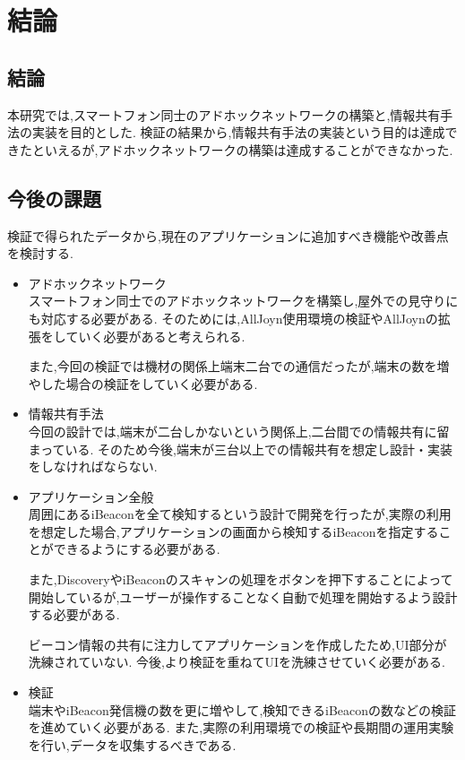 \chapter{結論}
\section{結論}
本研究では,スマートフォン同士のアドホックネットワークの構築と,情報共有手法の実装を目的とした.
検証の結果から,情報共有手法の実装という目的は達成できたといえるが,アドホックネットワークの構築は達成することができなかった.

\section{今後の課題}
検証で得られたデータから,現在のアプリケーションに追加すべき機能や改善点を検討する.

\begin{itemize}
\item アドホックネットワーク \\
スマートフォン同士でのアドホックネットワークを構築し,屋外での見守りにも対応する必要がある.
そのためには,AllJoyn使用環境の検証やAllJoynの拡張をしていく必要があると考えられる.

また,今回の検証では機材の関係上端末二台での通信だったが,端末の数を増やした場合の検証をしていく必要がある.

\item 情報共有手法 \\
今回の設計では,端末が二台しかないという関係上,二台間での情報共有に留まっている.
そのため今後,端末が三台以上での情報共有を想定し設計・実装をしなければならない.

\item アプリケーション全般 \\
  周囲にあるiBeaconを全て検知するという設計で開発を行ったが,実際の利用を想定した場合,アプリケーションの画面から検知するiBeaconを指定することができるようにする必要がある.
  
  また,DiscoveryやiBeaconのスキャンの処理をボタンを押下することによって開始しているが,ユーザーが操作することなく自動で処理を開始するよう設計する必要がある.
  
  ビーコン情報の共有に注力してアプリケーションを作成したため,UI部分が洗練されていない.
今後,より検証を重ねてUIを洗練させていく必要がある.

\item 検証 \\
端末やiBeacon発信機の数を更に増やして,検知できるiBeaconの数などの検証を進めていく必要がある.
また,実際の利用環境での検証や長期間の運用実験を行い,データを収集するべきである.


\end{itemize}



